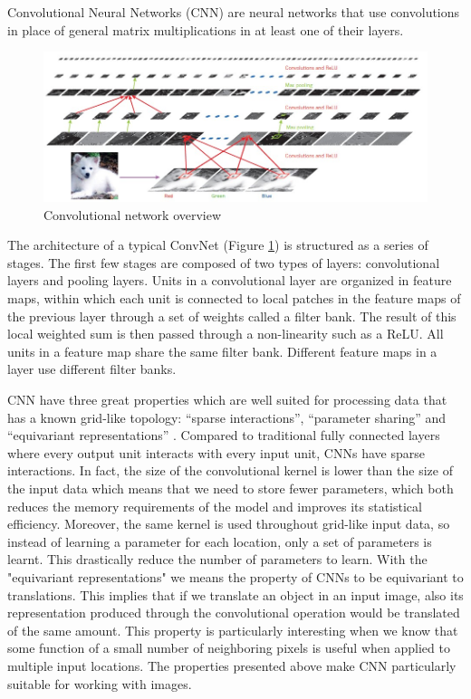 Convolutional Neural Networks (CNN) are neural networks that use convolutions in place of general matrix multiplications in at least one of their layers. 
\begin{figure}
\centerline{\includegraphics[scale=0.7]{images/chapter_2/CNN.jpg}}
\caption{Convolutional network overview \citep{DBLP:journals/nature/LeCunBH15}}
\label{fig:cnn_overview}
\end{figure}
The architecture of a typical ConvNet (Figure \ref{fig:cnn_overview}) is structured as a series of stages. The first few stages are composed of two types of layers: convolutional layers and pooling layers. Units in a convolutional layer are organized in feature maps, within which each unit is connected to local patches in the feature maps of the previous layer through a set of weights called a filter bank. The result of this local weighted sum is then passed through a non-linearity such as a ReLU. All units in a feature map share the same filter bank. Different feature maps in a layer use different filter banks.

CNN have three great properties which are well suited for processing data that has a known grid-like topology: “sparse interactions”, “parameter sharing” and “equivariant representations” \citep{goodfellow2016deep}. Compared to traditional fully connected layers where every output unit interacts with every input unit, CNNs have sparse interactions. In fact, the size of the convolutional kernel is lower than the size of the input data which means that we need to store fewer parameters, which both reduces the memory requirements of the model and improves its statistical efficiency. Moreover, the same kernel is used throughout grid-like input data, so instead of learning a parameter for each location, only a set of parameters is
learnt. This drastically reduce the number of parameters to learn. With the "equivariant representations" we means the property of CNNs to be equivariant to translations. This implies that if we translate an object in an input image, also its representation produced through the convolutional operation would be translated of the same amount. This property is particularly interesting when we know that some function of a small number of neighboring pixels is useful when applied to multiple input locations. The properties presented above make CNN particularly suitable for working with images. 

